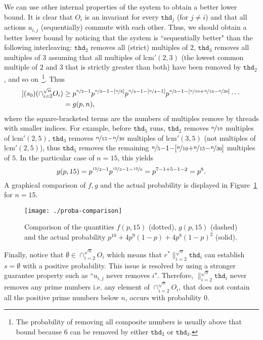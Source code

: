 \documentclass[review]{elsart}
\newcommand{\sem}[1]{[\![#1]\!]}
\newcommand{\bks}{*}
\newcommand{\thread}{\mathtt{thd}}
\begin{document}
We can use other internal properties of the system to obtain a better lower bound. It is clear that $O_i$ is an invariant for every $\thread_j$ (for $j{\neq} i$) and that all actions $u_{i,j}$ (sequentially) commute with each other. Thus, we should obtain a better lower bound by noticing that the system is ``sequentially better" than the following interleaving: $\thread_2$ removes all (strict) multiples of $2$, $\thread_3$ removes all multiples of $3$ assuming that all multiples of $\mathrm{lcm'}(2,3)$ (the lowest common multiple of $2$ and $3$ that is strictly greater than both) have been removed by $\thread_2$, and so on~\footnote{The probability of removing all composite numbers is  usually above that bound because $6$ can be removed by either $\thread_2$ or $\thread_3$.}. Thus 
\begin{align*}
	\sem{r^{\bks}\|_{i=2}^{\sqrt n}\thread_i}(s_0)({\cap}_{i=2}^{\sqrt n} O_i) &\geq p^{\nicefrac{n}{2}-1}p^{\nicefrac{n}{3}{-}1{-}[\nicefrac{n}{6}]}p^{\nicefrac{n}{4}{-}1{-}[\nicefrac{n}{4}{-}1]}p^{\nicefrac{n}{5}{-}1{-}[\nicefrac{n}{10}{+}\nicefrac{n}{15} - \nicefrac{n}{30}]}\cdots \\
	&= g(p,n),
\end{align*}
where the square-bracketed terms are the numbers of multiples remove by threads with smaller indices. For example, before $\thread_5$ runs, $\thread_2$ removes $\nicefrac{n}{10}$ multiples of $\mathrm{lcm'}(2,5)$, $\thread_3$ removes $\nicefrac{n}{15}{-}\nicefrac{n}{30}$ multiples of $\mathrm{lcm'}(3,5)$ (not multiples of $\mathrm{lcm'}(2,5)$), thus $\thread_5$ removes the remaining $\nicefrac{n}{5}{-}1{-}[\nicefrac{n}{10}{+}\nicefrac{n}{15}{-}\nicefrac{n}{30}]$ multiples of $5$. In the particular case of $n=15$, this yields
\[
	g(p,15) = p^{\nicefrac{15}{2}{-}1}p^{\nicefrac{15}{3}-1-\nicefrac{15}{6}} = p^{7-1+5-1-2} = p^8.
\] A graphical comparison of $f,g$ and the actual probability is displayed in Figure~\ref{fig:comparison} for $n = 15$.

\begin{figure}
\centering
\texttt{[image: ./proba-comparison]}
\caption{Comparison of the quantities $f(p,15)$ (dotted), $g(p,15)$ (dashed) and the actual probability $p^{10} {+} 4p^9(1{-}p) {+} 4p^8(1{-}p)^2$ (solid).}
\label{fig:comparison}
\end{figure}

\noindent{\textbf{Establising the property of $\|_{i=2}^{\sqrt n}\thread_i$}}

Finally, notice that $\emptyset{\in} {\cap}_{i=2}^{\sqrt n}O_i$ which means that $r^{\bks}\|_{i=2}^{\sqrt n}\thread_i$ can establish $s=\emptyset$ with a positive probability. This issue is resolved by using a stronger guarantee property such as ``$u_{i,j}$ never removes $i$". Therefore, $\|_{i=2}^{\sqrt n}\thread_i$ never removes any prime numbers i.e. any element of ${\cap}_{i=2}^{\sqrt n}O_i$, that does not contain all the positive prime numbers below $n$, occurs with probability $0$.
 
\end{document}
